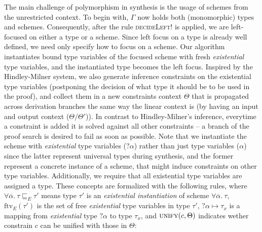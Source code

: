 \documentclass{llncs}
\def\Rho{P}
\begin{document}
The main challenge of polymorphism in synthesis is the usage of schemes from the
unrestricted context.  To begin with, $\Gamma$ now holds both (monomorphic)
types and schemes. Consequently, after the rule \textsc{decideLeft!} is applied,
we are left-focused on either a type or a scheme. Since left focus on a type is
already well defined, we need only specify how to focus on a scheme.
%
Our algorithm instantiates bound type variables of the focused scheme with fresh
\emph{existential} type variables, and the instantiated type becomes the left
focus. Inspired by the Hindley-Milner system, we also generate inference
constraints on the existential type variables (postponing the decision of what
type it should be to be used in the proof), and collect them in a new
constraints context $\Theta$ that is propagated across derivation branches the
same way the linear context is (by having an input and output context
($\Theta/\Theta'$)).  In contrast to Hindley-Milner's inference, everytime a
constraint is added it is solved against all other constraints -- a branch of
the proof search is desired to fail as soon as possible.
Note that we instantiate the scheme with \emph{existential} type variables
($?\alpha$) rather than just type variables ($\alpha$) since the latter
represent universal types during synthesis, and the former represent a concrete
instance of a scheme, that might induce constraints on other type variables.
Additionally, we require that all existential type variables are assigned a
type. These concepts are formalized with the following rules, where $\forall
\overline{\alpha}.\ \tau \sqsubseteq_E \tau'$ means type $\tau'$
is an \emph{existential instantiation} of scheme $\forall \overline{\alpha}.\ \tau$,
$\textrm{ftv}_E(\tau')$ is the set of free \emph{existential} type variables in
type $\tau'$, $?\alpha \mapsto \tau_x$ is a mapping from \emph{existential} type
$?\alpha$ to type $\tau_x$, and $\textsc{unify}(c, \Theta)$ indicates wether
constrain $c$ can be unified with those in $\Theta$:

\end{document}
